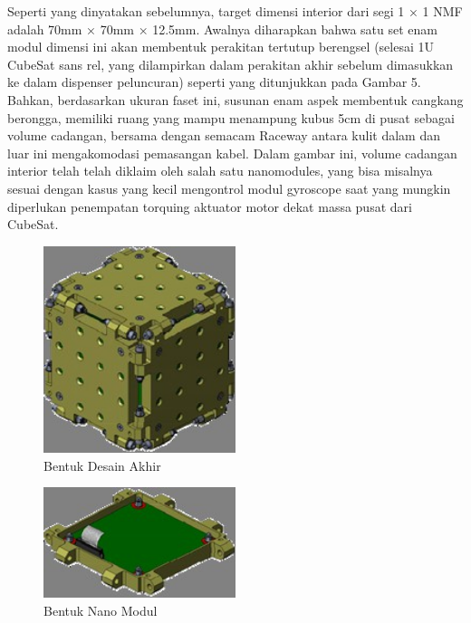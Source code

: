 Seperti yang dinyatakan sebelumnya, target dimensi interior dari segi 1 × 1 NMF adalah 70mm × 70mm × 12.5mm. Awalnya diharapkan bahwa satu set enam modul dimensi ini akan membentuk perakitan tertutup berengsel (selesai 1U CubeSat sans rel, yang dilampirkan dalam perakitan akhir sebelum dimasukkan ke dalam dispenser peluncuran) seperti yang ditunjukkan pada Gambar 5. Bahkan, berdasarkan ukuran faset ini, susunan enam aspek membentuk cangkang berongga, memiliki ruang yang mampu menampung kubus 5cm di pusat sebagai volume cadangan, bersama dengan semacam Raceway antara kulit dalam dan luar ini mengakomodasi pemasangan kabel. Dalam gambar ini, volume cadangan interior telah telah diklaim oleh salah satu nanomodules, yang bisa misalnya sesuai dengan kasus yang kecil mengontrol modul gyroscope saat yang mungkin diperlukan penempatan torquing aktuator motor dekat massa pusat dari CubeSat.

  \begin{figure}[ht]
\centerline{\includegraphics[width=0.5\textwidth]{figures/Thefinaldesign.jpg}}
  \caption{Bentuk Desain Akhir}
  \label{Thefinaldesign}
  \end{figure}

   \begin{figure}[ht]
\centerline{\includegraphics[width=0.5\textwidth]{figures/Ananomodule.jpg}}
  \caption{Bentuk Nano Modul}
  \label{Ananomodule}
  \end{figure}

